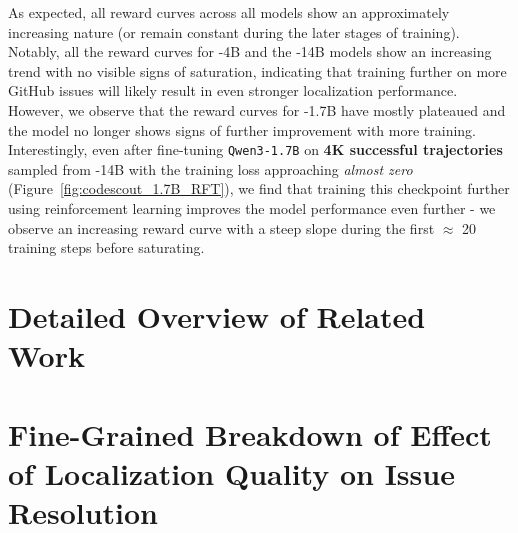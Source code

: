 As expected, all reward curves across all models show an approximately increasing nature (or remain constant during the later stages of training). Notably, all the reward curves for \methodname-4B and the \methodname-14B models show an increasing trend with no visible signs of saturation, indicating that training further on more GitHub issues will likely result in even stronger localization performance. However, we observe that the reward curves for \methodname-1.7B have mostly plateaued and the model no longer shows signs of further improvement with more training. Interestingly, even after fine-tuning \texttt{Qwen3-1.7B} on \textbf{4K successful trajectories} sampled from \methodname-14B with the training loss approaching \emph{almost zero} (Figure~\ref{fig:codescout_1.7B_RFT}), we find that training this checkpoint further using reinforcement learning improves the model performance even further - we observe an increasing reward curve with a steep slope during the first $\approx$ 20 training steps before saturating. 


\section{Detailed Overview of Related Work}\label{appendix:related_work_detailed}


\section{Fine-Grained Breakdown of Effect of Localization Quality on Issue Resolution}
\label{appendix:localization_quality}

